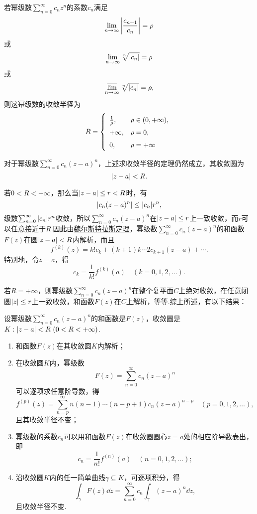 \begin{theorem}\label{theorem:解析函数的级数表示.复幂级数的收敛半径的求法}
若幂级数\(\sum_{n=0}^\infty c_n z^n\)的系数\(c_n\)满足\[
\lim_{n\to\infty} \abs{\frac{c_{n+1}}{c_n}} = \rho
\]或\[
\lim_{n\to\infty} \sqrt[n]{\abs{c_n}} = \rho
\]或\[
\varlimsup_{n\to\infty} \sqrt[n]{\abs{c_n}} = \rho,
\]则这幂级数的收敛半径为\[
\def\arraystretch{1.5}
R = \left\{ \begin{array}{ll}
\frac{1}{\rho}, & \rho \in (0,+\infty), \\
+\infty, & \rho = 0, \\
0, & \rho = +\infty \\
\end{array} \right.
\]
\end{theorem}
对于幂级数\(\sum_{n=0}^\infty c_n (z-a)^n\)，上述求收敛半径的定理仍然成立，其收敛圆为\[
\abs{z-a}<R.
\]

若\(0<R<+\infty\)，那么当\(\abs{z-a} \leq r < R\)时，有\[
\abs{c_n (z-a)^n} \leq \abs{c_n} r^n,
\]级数\(\sum_{n=0}^\infty \abs{c_n} r^n\)收敛，所以\(\sum_{n=0}^\infty c_n (z-a)^n\)在\(\abs{z-a} \leq r\)上一致收敛，而\(r\)可以任意接近于\(R\).因此由\hyperref[theorem:解析函数的级数表示.魏尔斯特拉斯定理]{魏尔斯特拉斯定理}，幂级数\(\sum_{n=0}^\infty c_n (z-a)^n\)的和函数\(F(z)\)在圆\(\abs{z-a}<R\)内解析，而且\[
f^{(k)}(z) = k! c_k + (k+1)k\dotsm2c_{k+1}(z-a)+\dotsb.
\]特别地，令\(z=a\)，得\[
c_k = \frac{1}{k!} f^{(k)}(a)
\quad(k=0,1,2,\dotsc).
\]

若\(R=+\infty\)，则幂级数\(\sum_{n=0}^\infty c_n (z-a)^n\)在整个复平面\(C\)上绝对收敛，在任意闭圆\(\abs{z} \leq r\)上一致收敛，和函数\(F(z)\)在\(C\)上解析，等等.综上所述，有以下结果：
\begin{theorem}\label{theorem:解析函数的级数表示.幂级数的和函数的性质}
设幂级数\(\sum_{n=0}^\infty c_n (z-a)^n\)的和函数是\(F(z)\)，收敛圆是\(K: \abs{z-a}<R\ (0<R<+\infty)\).\begin{enumerate}
\item 和函数\(F(z)\)在其收敛圆\(K\)内解析；

\item 在收敛圆\(K\)内，幂级数\[
F(z) = \sum_{n=0}^\infty c_n (z-a)^n
\]可以逐项求任意阶导数，得\begin{equation}
f^{(p)}(z) = \sum_{n=p}^\infty n(n-1)\dotsm(n-p+1) c_n (z-a)^{n-p}
\quad(p=0,1,2,\dotsc),
\end{equation}且其收敛半径不变；

\item 幂级数的系数\(c_n\)可以用和函数\(F(z)\)在收敛圆圆心\(z=a\)处的相应阶导数表出，即\begin{equation}
c_n = \frac{1}{n!} f^{(n)}(a)
\quad(n=0,1,2,\dotsc);
\end{equation}

\item 沿收敛圆\(K\)内的任一简单曲线\(\gamma \subseteq K\)，可逐项积分，得\begin{equation}
\int_{\gamma} F(z) \dd{z}
= \sum_{n=0}^\infty c_n \int_{\gamma} (z-a)^n \dd{z},
\end{equation}且收敛半径不变.
\end{enumerate}
\end{theorem}

